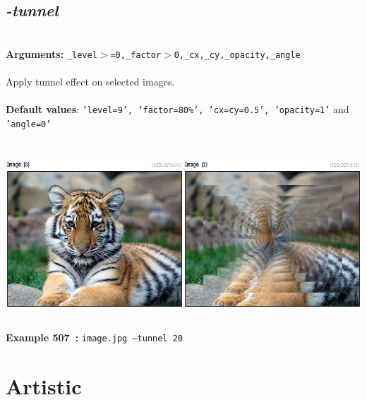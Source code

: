 \documentclass[a4paper,11pt,twoside]{book}
\begin{document}
\subsection{\emph{-tunnel} }\vspace*{-0.5em}
~\\\textbf{Arguments: } 
{\small \texttt{\_level$>$=0,\_factor$>$0,\_cx,\_cy,\_opacity,\_angle}}\\~\\
Apply tunnel effect on selected images.
~\\~\\\textbf{Default values}: {\small \texttt{'level=9', 'factor=80\%', 'cx=cy=0.5', 'opacity=1'} and \texttt{'angle=0'}}
\begin{center}\includegraphics[keepaspectratio=true,height=7cm,width=\textwidth]{img/gmic_def507.jpg}\\
{\footnotesize \textbf{Example 507~:} \texttt{image.jpg --tunnel 20}}
\end{center}
\section{Artistic}
\end{document}
